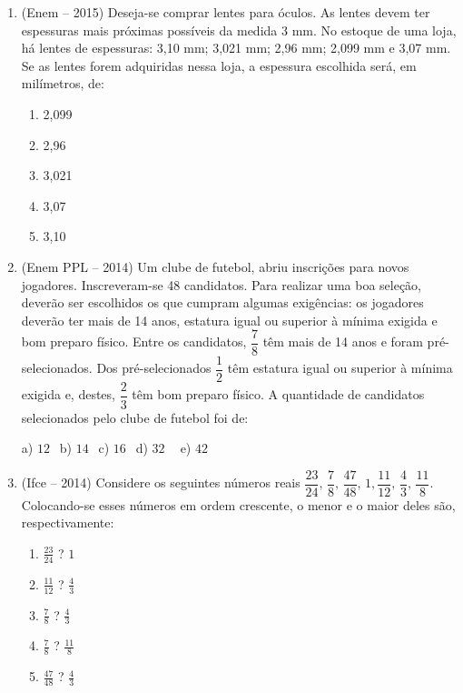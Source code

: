 \begin{multicols*}{2}
\begin{enumerate}
\begin{enumerate}
              \end{enumerate}

        \item (Enem – 2015) Deseja-se comprar lentes para óculos. As lentes devem ter espessuras mais próximas possíveis da medida 3 mm. No estoque de uma loja, há lentes de espessuras: 3,10 mm; 3,021 mm; 2,96 mm; 2,099 mm e 3,07 mm.
              Se as lentes forem adquiridas nessa loja, a espessura escolhida será, em milímetros, de:

              \begin{enumerate}

                  \item 2,099
                  \item 2,96
                  \item 3,021
                  \item 3,07
                  \item 3,10

              \end{enumerate}

        \item (Enem PPL – 2014) Um clube de futebol, abriu inscrições para novos jogadores. Inscreveram-se 48 candidatos. Para realizar uma boa seleção, deverão ser escolhidos os que cumpram algumas exigências: os jogadores deverão ter mais de 14 anos, estatura igual ou superior à mínima exigida e bom preparo físico. Entre os candidatos, $\dfrac{7}{8}$ têm mais de 14 anos e foram pré-selecionados. Dos pré-selecionados $\dfrac{1}{2}$ têm estatura igual ou superior à mínima exigida e, destes, $\dfrac{2}{3}$ têm bom preparo físico. A quantidade de candidatos selecionados pelo clube de futebol foi de:

              a) $12 \ \ $ b) $14 \ \ $ c) $16 \ \ $ d) $32 \ \ \ \ $ e) $42 \ \ $

        \item (Ifce – 2014) Considere os seguintes números reais $\dfrac{23}{24},\, \dfrac{7}{8},\, \dfrac{47}{48},\, 1, \dfrac{11}{12},\, \dfrac{4}{3},\, \dfrac{11}{8} $. Colocando-se esses números em ordem crescente, o menor e o maior deles são, respectivamente:

              \begin{enumerate}

                  \item $ \frac{23}{24}$ ? $ 1 $
                  \item $ \frac{11}{12}$ ? $ \frac{4}{3} $
                  \item $ \frac{7}{8}$ ? $ \frac{4}{3} $
                  \item $ \frac{7}{8}$ ? $ \frac{11}{8} $
                  \item $ \frac{47}{48}$ ? $ \frac{4}{3} $


\end{enumerate}
\end{enumerate}
\end{multicols*}
